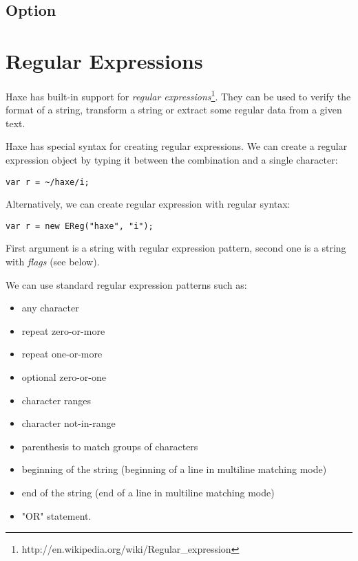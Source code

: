 \documentclass{haxe}
\begin{document}
\subsection{Option}
\label{std-Option}

\section{Regular Expressions}
\label{std-regex}

Haxe has built-in support for \emph{regular expressions}\footnote{http://en.wikipedia.org/wiki/Regular_expression}. They can be used to verify the format of a string, transform a string or extract some regular data from a given text.

Haxe has special syntax for creating regular expressions. We can create a regular expression object by typing it between the \expr{\textasciitilde/} combination and a single \expr{/} character:

\begin{lstlisting}
var r = ~/haxe/i;
\end{lstlisting}

Alternatively, we can create regular expression with regular syntax:

\begin{lstlisting}
var r = new EReg("haxe", "i");
\end{lstlisting}

First argument is a string with regular expression pattern, second one is a string with \emph{flags} (see below).

We can use standard regular expression patterns such as:
\begin{itemize}
    \item {} any character
    \item \expr{*} repeat zero-or-more
    \item \expr{+} repeat one-or-more
    \item {} optional zero-or-one
    \item \expr{[A-Z0-9]} character ranges
    \item {} character not-in-range
    \item {} parenthesis to match groups of characters
    \item \expr{\textasciicircum} beginning of the string (beginning of a line in multiline matching mode)
    \item \expr{\$} end of the string (end of a line in multiline matching mode)
    \item \expr{|} "OR" statement.
\end{itemize}
\end{document}
